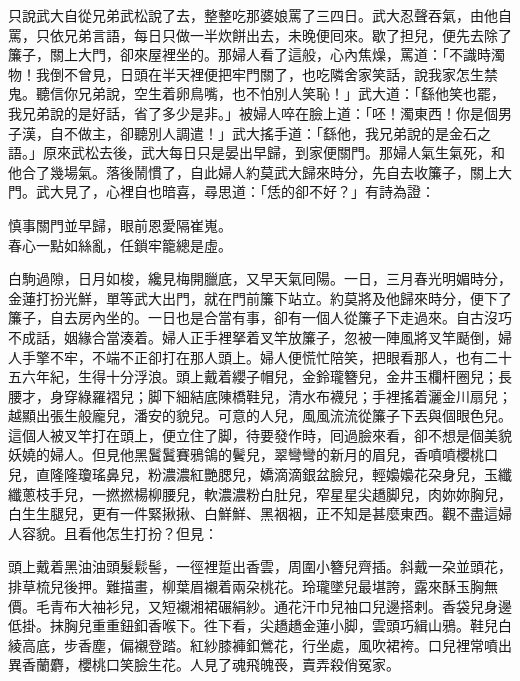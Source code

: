 只說武大自從兄弟武松說了去，整整吃那婆娘罵了三四日。武大忍聲吞氣，由他自罵，只依兄弟言語，每日只做一半炊餅出去，未晚便囘來。歇了担兒，便先去除了簾子，關上大門，卻來屋裡坐的。那婦人看了這般，心內焦燥，罵道：「不識時濁物！我倒不曾見，日頭在半天裡便把牢門關了，也吃隣舍家笑話，說我家怎生禁鬼。聽信你兄弟說，空生着卵鳥嘴，也不怕別人笑恥！」武大道：「繇他笑也罷，{}我兄弟說的是好話，省了多少是非。」被婦人啐在臉上道：「呸！濁東西！你是個男子漢，自不做主，卻聽別人調遣！」武大搖手道：「繇他，我兄弟說的是金石之語。」原來武松去後，武大每日只是晏出早歸，到家便關門。那婦人氣生氣死，和他合了幾場氣。落後鬧慣了，自此婦人約莫武大歸來時分，先自去收簾子，關上大門。武大見了，心裡自也暗喜，尋思道：「恁的卻不好？」有詩為證：

\begin{myquote}
慎事關門並早歸，眼前恩愛隔崔嵬。\\春心一點如絲亂，任鎖牢籠總是虛。
\end{myquote}

白駒過隙，日月如梭，纔見梅開臘底，又早天氣囘陽。一日，三月春光明媚時分，金蓮打扮光鮮，單等武大出門，就在門前簾下站立。約莫將及他歸來時分，便下了簾子，自去房內坐的。一日也是合當有事，卻有一個人從簾子下走過來。自古沒巧不成話，姻緣合當湊着。婦人正手裡拏着叉竿放簾子，忽被一陣風將叉竿颳倒，婦人手擎不牢，不端不正卻打在那人頭上。婦人便慌忙陪笑，把眼看那人，也有二十五六年紀，生得十分浮浪。頭上戴着纓子帽兒，金鈴瓏簪兒，金井玉欄杆圈兒；長腰才，身穿綠羅褶兒；脚下細結底陳橋鞋兒，清水布襪兒；手裡搖着灑金川扇兒；越顯出張生般龐兒，潘安的貌兒。可意的人兒，風風流流從簾子下丟與個眼色兒。這個人被叉竿打在頭上，便立住了脚，待要發作時，囘過臉來看，卻不想是個美貌妖嬈的婦人。{}但見他黑鬒鬒賽鴉鴒的鬢兒，翠彎彎的新月的眉兒，香噴噴櫻桃口兒，直隆隆瓊瑤鼻兒，粉濃濃紅艷腮兒，嬌滴滴銀盆臉兒，輕嬝嬝花朶身兒，玉纖纖蔥枝手兒，一撚撚楊柳腰兒，軟濃濃粉白肚兒，窄星星尖趫脚兒，肉妳妳胸兒，白生生腿兒，更有一件緊揪揪、白鮮鮮、黑裀裀，正不知是甚麼東西。{}觀不盡這婦人容貌。且看他怎生打扮？但見：

\begin{myquote}
頭上戴着黑油油頭髮鬏髻，一徑裡踅出香雲，周圍小簪兒齊插。斜戴一朶並頭花，排草梳兒後押。難描畫，柳葉眉襯着兩朶桃花。玲瓏墜兒最堪誇，露來酥玉胸無價。毛青布大袖衫兒，又短襯湘裙碾絹紗。{}通花汗巾兒袖口兒邊搭剌。香袋兒身邊低掛。抹胸兒重重鈕釦香喉下。徃下看，尖趫趫金蓮小脚，雲頭巧緝山鴉。鞋兒白綾高底，步香塵，偏襯登踏。紅紗膝褲釦鶯花，行坐處，風吹裙袴。口兒裡常噴出異香蘭麝，櫻桃口笑臉生花。人見了魂飛魄䘮，賣弄殺俏冤家。
\end{myquote}


